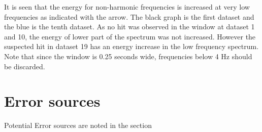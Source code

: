 It is seen that the energy for non-harmonic frequencies is increased at very low frequencies as indicated with the arrow. The black graph is the first dataset and the blue is the tenth dataset. As no hit was observed in the window at dataset 1 and 10, the energy of lower part of the spectrum was not increased. However the suspected hit in dataset 19 has an energy increase in  the low frequency spectrum. Note that since the window is 0.25 seconds wide, frequencies below 4 Hz should be discarded.

\section{Error sources}

Potential Error sources are noted in the section

